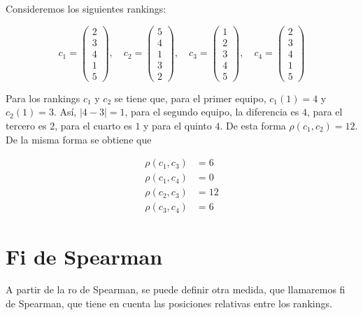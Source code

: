 \begin{ejemplo}
Consideremos los siguientes rankings:

\begin{equation*}
c_1 = \left( \begin{array}{c}
2\\
3\\
4\\
1\\
5
\end{array} \right), \quad
c_2 = \left( \begin{array}{c}
5\\
4\\
1\\
3\\
2
\end{array} \right), \quad
c_3 = \left( \begin{array}{c}
1\\
2\\
3\\
4\\
5
\end{array} \right), \quad
c_4 = \left( \begin{array}{c}
2\\
3\\
4\\
1\\
5
\end{array} \right)
\end{equation*}

Para los rankings $c_1$ y $c_2$ se tiene que, para el primer equipo, $c_1(1) = 4$ y $c_2(1) = 3$. Así, $|4-3| = 1$, para el segundo equipo, la diferencia es $4$, para el tercero es $2$, para el cuarto es $1$ y para el quinto $4$. De esta forma $\rho(c_1, c_2) = 12$. De la misma forma se obtiene que 

\begin{align*}
\rho(c_1, c_3) & = 6\\
\rho(c_1, c_4) & = 0\\
\rho(c_2, c_3) & = 12\\
\rho(c_3, c_4) & = 6
\end{align*}  
\end{ejemplo}

\section{Fi de Spearman}

A partir de la ro de Spearman, se puede definir otra medida, que llamaremos fi de Spearman, que tiene en cuenta las posiciones relativas entre los rankings.

